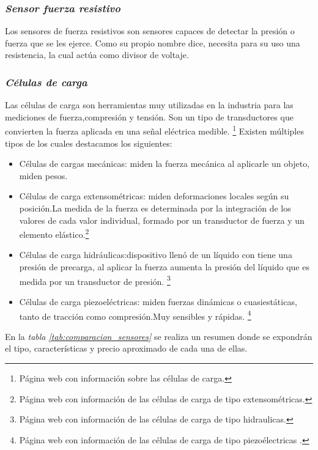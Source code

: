 \subsubsection{\textit{{Sensor fuerza resistivo}}}
Los sensores de fuerza resistivos son sensores capaces de detectar la presión o fuerza que se les ejerce.
Como su propio nombre dice, necesita para su uso una resistencia, la cual actúa como divisor de voltaje.
\subsubsection{\textit{{Células de carga}}}
Las células de carga son herramientas muy utilizadas en la industria para las mediciones de fuerza,compresión y tensión.
Son un tipo de transductores que convierten la fuerza aplicada  en una señal eléctrica medible. \cite{Celula_Carga}\footnote{Página web con información sobre las células de carga\cite{Celula_Carga}.}
Existen múltiples tipos de los cuales destacamos los siguientes:
    \begin{itemize}
        \item Células de cargas mecánicas: miden la fuerza mecánica al aplicarle un objeto, miden pesos.
        \item Células de carga extensométricas: miden deformaciones locales según su posición.La medida de la fuerza es determinada por la integración de los valores de cada valor individual, formado por un transductor de fuerza y un elemento elástico.\cite{celulas_extensométricas}\footnote{Página web con información de las células de carga de tipo extensométricas\cite{celulas_extensométricas}.}
        \item Células de carga hidráulicas:dispositivo llenó de un líquido con tiene una presión de precarga, al aplicar la fuerza aumenta la presión del líquido que es medida por un transductor de presión.
        \cite{Celulas_hidraulicas}\footnote{Página web con información de las células de carga de tipo hidraulicas\cite{Celulas_hidraulicas}.}
        \item Células de carga piezoeléctricas: miden fuerzas dinámicas o cuasiestáticas, tanto de tracción como compresión.Muy sensibles y rápidas.
        \cite{Celulas_piezoelectricas}\footnote{Página web con información de las células de carga de tipo piezoélectricas \cite{Celulas_piezoelectricas}.}
    \end{itemize}
En la \textit{tabla \ref{tab:comparacion_sensores}} se realiza un resumen donde se expondrán el tipo, características y precio aproximado de cada una de ellas.
